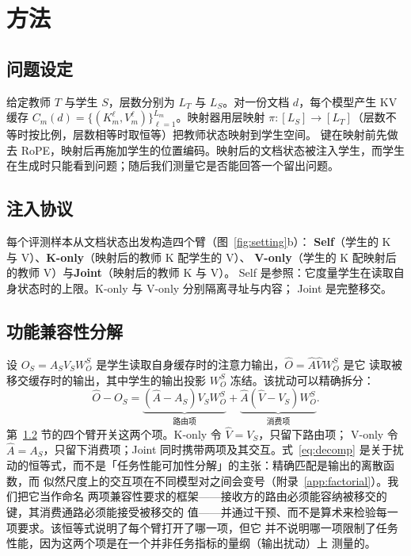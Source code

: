 \documentclass[11pt]{article}
\begin{document}
\section{方法}

\subsection{问题设定}
\label{sec:problem-setup}
给定教师 $T$ 与学生 $S$，层数分别为 $L_T$ 与 $L_S$。对一份文档 $d$，每个模型产生 KV
缓存 $C_m(d)=\{(K_m^\ell,V_m^\ell)\}_{\ell=1}^{L_m}$。映射器用层映射
$\pi:[L_S]\to[L_T]$（层数不等时按比例，层数相等时取恒等）把教师状态映射到学生空间。
键在映射前先做去 RoPE，映射后再施加学生的位置编码。映射后的文档状态被注入学生，而学生
在生成时只能看到问题；随后我们测量它是否能回答一个留出问题。

\subsection{注入协议}
\label{sec:injection}
每个评测样本从文档状态出发构造四个臂（图~\ref{fig:setting}b）：
\textbf{Self}（学生的 K 与 V）、\textbf{K-only}（映射后的教师 K 配学生的 V）、
\textbf{V-only}（学生的 K 配映射后的教师 V）与\textbf{Joint}（映射后的教师 K 与 V）。
Self 是参照：它度量学生在读取自身状态时的上限。K-only 与 V-only 分别隔离寻址与内容；
Joint 是完整移交。

\subsection{功能兼容性分解}
\label{sec:decomp}
设 $O_S=A_SV_SW_O^S$ 是学生读取自身缓存时的注意力输出，$\hat O=\hat A\hat VW_O^S$ 是它
读取被移交缓存时的输出，其中学生的输出投影 $W_O^S$ 冻结。该扰动可以精确拆分：
\begin{equation}
\hat O-O_S
= \underbrace{(\hat A-A_S)V_SW_O^S}_{\text{路由项}}
+ \underbrace{\hat A(\hat V-V_S)W_O^S}_{\text{消费项}} .
\label{eq:decomp}
\end{equation}
第~\ref{sec:injection} 节的四个臂开关这两个项。K-only 令 $\hat V=V_S$，只留下路由项；
V-only 令 $\hat A=A_S$，只留下消费项；Joint 同时携带两项及其交互。式~\eqref{eq:decomp}
是关于扰动的恒等式，而不是「任务性能可加性分解」的主张：精确匹配是输出的离散函数，而
似然尺度上的交互项在不同模型对之间会变号（附录~\ref{app:factorial}）。我们把它当作命名
两项兼容性要求的框架——接收方的路由必须能容纳被移交的键，其消费通路必须能接受被移交的
值——并通过干预、而不是算术来检验每一项要求。该恒等式说明了每个臂打开了哪一项，但它
并不说明哪一项限制了任务性能，因为这两个项是在一个并非任务指标的量纲（输出扰动）上
测量的。
\end{document}
